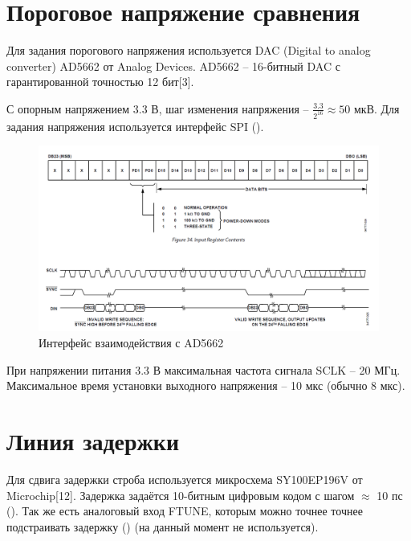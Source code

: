 \section{Пороговое напряжение сравнения}

Для задания порогового напряжения используется DAC (Digital to analog converter) AD5662 от Analog Devices.
AD5662 -- 16-битный DAC с гарантированной точностью 12 бит[3].


С опорным напряжением 3.3 В, шаг изменения напряжения -- $ \frac{3.3}{2^{16}} \approx 50 $ мкВ.
Для задания напряжения используется интерфейс SPI ().

\begin{figure}[ht!] 
	\center
	\includegraphics [scale=0.5] {my_folder/images//dac_interface}
	\caption{Интерфейс взаимодействия с AD5662} 
	\label{fig:dac-interface}  
\end{figure}

При напряжении питания 3.3 В максимальная частота сигнала SCLK -- 20 МГц. Максимальное время установки
выходного напряжения -- 10 мкс (обычно 8 мкс).

\section{Линия задержки}

Для сдвига задержки строба используется микросхема SY100EP196V от Microchip[12]. Задержка задаётся 10-битным
цифровым кодом с шагом $ \approx $ 10 пс (). Так же есть аналоговый вход FTUNE, которым можно точнее точнее подстраивать
задержку () (на данный момент не используется).

